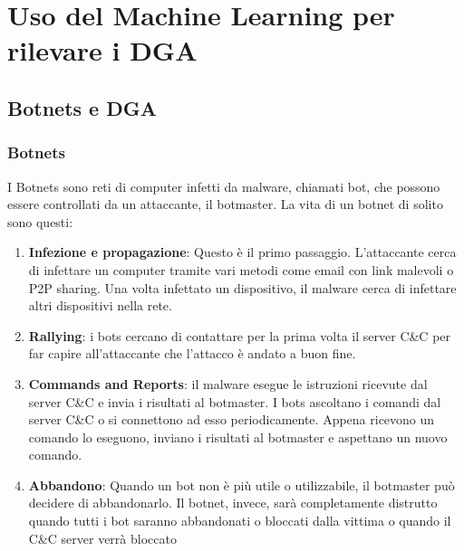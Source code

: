 \documentclass[12pt,a4paper,openright,twoside]{book}
\begin{document}

\chapter{Uso del Machine Learning per rilevare i DGA}

\section{Botnets e DGA}

\subsection{Botnets}

I Botnets sono reti di computer infetti da malware, chiamati bot,
che possono essere controllati da un attaccante, il botmaster.
La vita di un botnet di solito sono questi:
\begin{enumerate}
    \item \textbf{Infezione e propagazione}: Questo è il primo
    passaggio. L'attaccante cerca di infettare un computer
    tramite vari metodi come email con link malevoli o \acrfull{P2P} sharing.
    Una volta infettato un dispositivo, il malware cerca di infettare
    altri dispositivi nella rete.

    \item \textbf{Rallying}: i bots cercano di contattare per la prima volta
    il server \acrshort{C&C} per far capire all'attaccante
    che l'attacco è andato a buon fine.

    \item \textbf{Commands and Reports}: il malware esegue le istruzioni
    ricevute dal server \acrshort{C&C} e invia i risultati al botmaster.
    I bots ascoltano i comandi dal server \acrshort{C&C} 
    o si connettono ad esso periodicamente. Appena ricevono
    un comando lo eseguono, inviano i risultati al botmaster
    e aspettano un nuovo comando.

    \item \textbf{Abbandono}: Quando un bot non è più utile o utilizzabile,
    il botmaster può decidere di abbandonarlo. Il botnet, invece,
    sarà completamente distrutto quando tutti i bot saranno
    abbandonati o bloccati dalla vittima o quando il \acrshort{C&C} server
    verrà bloccato


\end{enumerate}
\end{document}
